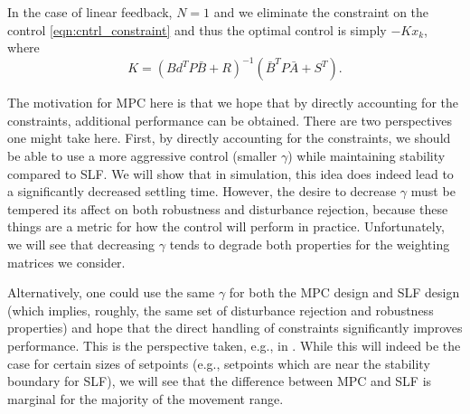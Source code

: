 \documentclass[journal,twocolumn,twoside]{IEEEtran}
\newcommand{\Ad}{\ensuremath{\bar A }\xspace}
\newcommand{\Bd}{\ensuremath{\bar B }\xspace}
\begin{document}
In the case of linear feedback, $N=1$ and we eliminate the constraint on the control \eqref{eqn:cntrl_constraint} and thus the optimal control is simply $-Kx_k$, where
\begin{equation}
  K = (Bd^TP\Bd + R)^{-1}(\Bd^TP\Ad + S^T).
\end{equation}

The motivation for MPC here is that we hope that by directly accounting for the constraints, additional performance can be obtained. There are two perspectives one might take here. First, by directly accounting for the constraints, we should be able to use a more aggressive control (smaller $\gamma$) while maintaining stability compared to SLF.
We will show that in simulation, this idea does indeed lead to a significantly decreased settling time. However, the desire to decrease $\gamma$ must be tempered its affect on both robustness and disturbance rejection, because these things are a metric for how the control will perform in practice. Unfortunately, we will see that decreasing $\gamma$ tends to degrade both properties for the weighting matrices we consider. 

Alternatively, one could use the same $\gamma$ for both the MPC design and SLF design (which implies, roughly,  the same set of disturbance rejection and robustness properties) and hope that the direct handling of constraints significantly improves performance. This is the perspective taken, e.g., in \cite{Wills_CDC_2005}. While this will indeed be the case for certain sizes of setpoints (e.g., setpoints which are near the stability boundary for SLF), we will see that the difference between MPC and SLF is marginal for the majority of the movement range.

\end{document}
